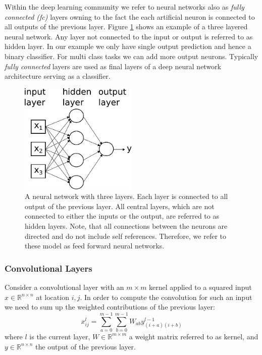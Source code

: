 Within the deep learning community we refer to neural networks also as \emph{fully connected (\ac{fc})} layers owning to the fact the each artificial neuron is connected to all outputs of the previous layer. Figure \ref{fig:nn} shows an example of a three layered neural network. Any layer not connected to the input or output is referred to as hidden layer. In our example we only have single output prediction and hence a binary classifier. For multi class tasks we can add more output neurons. Typically \emph{fully connected} layers are used as final layers of a deep neural network architecture serving as a classifier.

	\begin{figure}[]
  		\centering
    	\includegraphics[width=0.5\textwidth, keepaspectratio]{img/nn.pdf}
    	\caption{A neural network with three layers. Each layer is connected to all output of the previous layer. All central layers, which are not connected to either the inputs or the output, are referred to as hidden layers. Note, that all connections between the neurons are directed and do not include self references. Therefore, we refer to these model as feed forward neural networks.}
    	\label{fig:nn}
	\end{figure}

\subsubsection{Convolutional Layers}

Consider a convolutional layer with an $m \times m$ kernel applied to a squared input $x \in\mathbb{R}^{n \times n}$ at location $i, j$. In order to compute the convolution for such an input we need to sum up the weighted contributions of the previous layer:
$$
x^l_{ij} = \sum_{a=0}^{m-1}\sum_{b=0}^{m-1} W_{ab} y^{l-1}_{(i+a)(i+b)}
$$
where $l$ is the current layer, $ W \in\mathbb{R}^{m \times m} $ a weight matrix referred to as kernel, and $y \in\mathbb{R}^{n \times n} $ the output of the previous layer.

